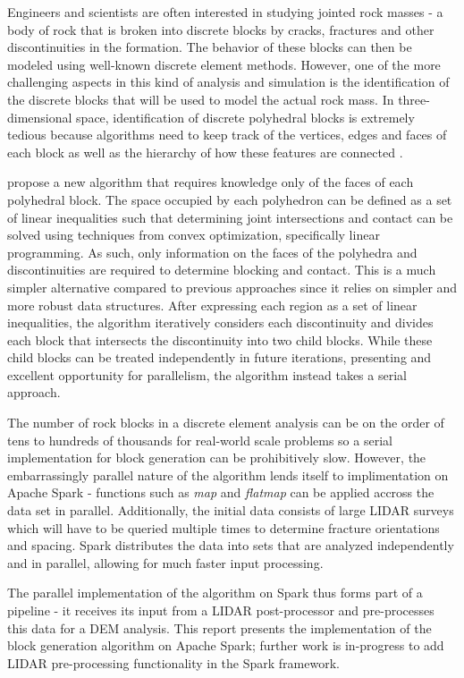 Engineers and scientists are often interested in studying jointed rock masses - a body of rock that is broken into discrete blocks by cracks, fractures and other discontinuities in the formation. The behavior of these blocks can then be modeled using well-known discrete element methods. However, one of the more challenging aspects in this kind of analysis and simulation is the identification of the discrete blocks that will be used to model the actual rock mass. In three-dimensional space, identification of discrete polyhedral blocks is extremely tedious because algorithms need to keep track of the vertices, edges and faces of each block as well as the hierarchy of how these features are connected \cite{slicing}. \par

\cite{slicing} propose a new algorithm that requires knowledge only of the faces of each polyhedral block. The space occupied by each polyhedron can be defined as a set of linear inequalities such that determining joint intersections and contact can be solved using techniques from convex optimization, specifically linear programming. As such, only information on the faces of the polyhedra and discontinuities are required to determine blocking and contact. This is a much simpler alternative compared to previous approaches since it relies on simpler and more robust data structures. After expressing each region as a set of linear inequalities, the algorithm iteratively considers each discontinuity and divides each block that intersects the discontinuity into two child blocks. While these child blocks can be treated independently in future iterations, presenting and excellent opportunity for parallelism, the algorithm instead takes a serial approach. \par

The number of rock blocks in a discrete element analysis can be on the order of tens to hundreds of thousands for real-world scale problems so a serial implementation for block generation can be prohibitively slow. However, the embarrassingly parallel nature of the algorithm lends itself to implimentation on Apache Spark - functions such as \textit{map} and \textit{flatmap} can be applied accross the data set in parallel. Additionally, the initial data consists of large LIDAR surveys which will have to be queried multiple times to determine fracture orientations and spacing. Spark distributes the data into sets that are analyzed independently and in parallel, allowing for much faster input processing. \par

The parallel implementation of the \cite{slicing} algorithm on Spark thus forms part of a pipeline - it receives its input from a LIDAR post-processor and pre-processes this data for a DEM analysis. This report presents the implementation of the block generation algorithm on Apache Spark; further work is in-progress to add LIDAR pre-processing functionality in the Spark framework.

